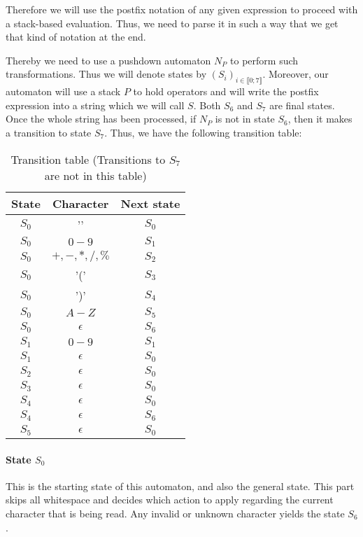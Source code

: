 \documentclass[a4paper,11pt,titlepage]{article}
\begin{document}
Therefore we will use the postfix notation of any given expression to proceed with a stack-based evaluation. Thus, we need to parse it in such a way that we get that kind of notation at the end.

Thereby we need to use a pushdown automaton $N_P$ to perform such transformations. Thus we will denote states by $(S_i)_{i\in\llbracket0;7\rrbracket}$. Moreover, our automaton will use a stack $P$ to hold operators and will write the postfix expression into a string which we will call $S$. Both $S_6$ and $S_7$ are final states. Once the whole string has been processed, if $N_P$ is not in state $S_6$, then it makes a transition to state $S_7$. Thus, we have the following transition table:

\begin{table}[H]
    \centering
    \begin{tabular}{|c||c|c|}
        \hline
        State &  Character & Next state \\ \hline\hline
        $S_0$ &  '\;\;' & $S_0$ \\ \hline
        $S_0$ & $0-9$ & $S_1$ \\ \hline
        $S_0$ & $+,-,*,/,\%$ & $S_2$ \\ \hline
        $S_0$ & '(' & $S_3$ \\ \hline
        $S_0$ & ')' & $S_4$ \\ \hline
        $S_0$ & $A-Z$ & $S_5$ \\ \hline
        $S_0$ & $\epsilon$ & $S_6$\\ \hline
        $S_1$ & $0-9$ & $S_1$ \\ \hline
        $S_1$ & $\epsilon$ & $S_0$ \\ \hline
        $S_2$ & $\epsilon$ & $S_0$ \\\hline
        $S_3$ & $\epsilon$ & $S_0$ \\ \hline
        $S_4$ & $\epsilon$ & $S_0$ \\ \hline
        $S_4$ & $\epsilon$ & $S_6$ \\ \hline
        $S_5$ & $\epsilon$ & $S_0$ \\ \hline
    \end{tabular}
    \caption{Transition table (Transitions to $S_7$ are not in this table)}
\end{table}

\paragraph{State $S_0$} This is the starting state of this automaton, and also the general state. This part skips all whitespace and decides which action to apply regarding the current character that is being read. Any invalid or unknown character yields the state $S_6$.
\end{document}
